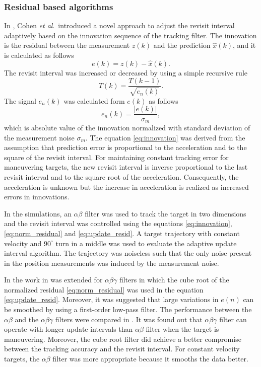 \documentclass[english, 12pt, a4paper, elec, utf8, a-1b, online]{aaltothesis}
\newcommand{\etal}{\textit{et al}.~}
\begin{document}
\subsubsection{Residual based algorithms}

In \cite{Cohen1986}, Cohen \etal introduced a novel approach to adjust the revisit interval adaptively based on the innovation sequence of the tracking filter.
The innovation is the residual between the measurement $z(k)$ and the prediction $\hat{x}(k)$, and it is calculated as follows
\begin{equation}\label{eq:innovation}
    e(k) = z(k) - \hat{x}(k).
\end{equation}
The revisit interval was increased or decreased by using a simple recursive rule 
\begin{equation}\label{eq:update_resid}
    T(k) = \frac{T(k-1)}{\sqrt{e_n(k)}}.
\end{equation}
The signal $e_n(k)$ was calculated form $e(k)$ as follows
\begin{equation}\label{eq:norm_residual}
    e_n(k) = \frac{|e(k)|}{\sigma_m},
\end{equation}
which is absolute value of the innovation normalized with standard deviation of the measurement noise $\sigma_m$.
The equation \eqref{eq:innovation} was derived from the assumption that prediction error is proportional to the acceleration and to the square of the revisit interval.
For maintaining constant tracking error for maneuvering targets, the new revisit interval is inverse proportional to the last revisit interval and to the square root of the acceleration.
Consequently, the acceleration is unknown but the increase in acceleration is realized as increased errors in innovations.

In the simulations, an $\alpha \beta$ filter was used to track the target in two dimensions and the revisit interval was controlled using the equations \eqref{eq:innovation},\eqref{eq:norm_residual} and \eqref{eq:update_resid}.
A target trajectory with constant velocity and $90^\circ$ turn in a middle was used to evaluate the adaptive update interval algorithm.
The trajectory was noiseless such that the only noise present in the position measurements was induced by the measurement noise. 

In \cite{Gardner1988} the work in \cite{Cohen1986} was extended for $\alpha\beta\gamma$ filters in which the cube root of the normalized residual \eqref{eq:norm_residual} was used in the equation \eqref{eq:update_resid}.
Moreover, it was suggested that large variations in $e(n)$ can be smoothed by using a first-order low-pass filter.
The performance between the $\alpha\beta$ and the $\alpha\beta\gamma$ filters were compared in \cite{Munu1992}.
It was found out that $\alpha\beta\gamma$ filter can operate with longer update intervals than $\alpha\beta$ filter when the target is maneuvering.
Moreover, the cube root filter did achieve a better compromise between the tracking accuracy and the revisit interval.     
For constant velocity targets, the $\alpha\beta$ filter was more appropriate because it smooths the data better.
\end{document}
